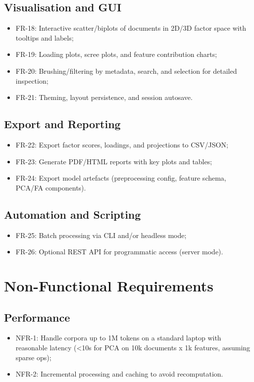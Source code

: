 \subsection{Visualisation and GUI}
\begin{itemize}
    \item FR-18: Interactive scatter/biplots of documents in 2D/3D factor space with tooltips and labels;
    \item FR-19: Loading plots, scree plots, and feature contribution charts;
    \item FR-20: Brushing/filtering by metadata, search, and selection for detailed inspection;
    \item FR-21: Theming, layout persistence, and session autosave.
\end{itemize}

\subsection{Export and Reporting}
\begin{itemize}
    \item FR-22: Export factor scores, loadings, and projections to CSV/JSON;
    \item FR-23: Generate PDF/HTML reports with key plots and tables;
    \item FR-24: Export model artefacts (preprocessing config, feature schema, PCA/FA components).
\end{itemize}

\subsection{Automation and Scripting}
\begin{itemize}
    \item FR-25: Batch processing via CLI and/or headless mode;
    \item FR-26: Optional REST API for programmatic access (server mode).
\end{itemize}

\section{Non-Functional Requirements}
\subsection{Performance}
\begin{itemize}
    \item NFR-1: Handle corpora up to 1M tokens on a standard laptop with reasonable latency (\textless 10s for PCA on 10k documents x 1k features, assuming sparse ops);
    \item NFR-2: Incremental processing and caching to avoid recomputation.
\end{itemize}

